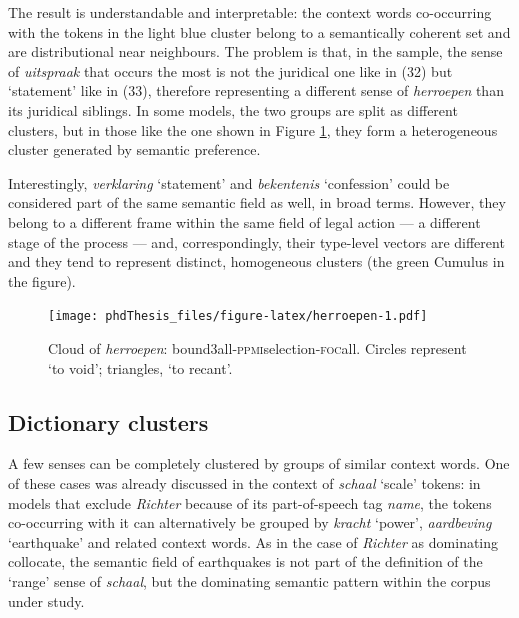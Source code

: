 \documentclass[
]{book}
\begin{document}
The result is understandable and interpretable: the context words co-occurring with the tokens in the light blue cluster belong to a semantically coherent set and are distributional near neighbours. The problem is that, in the sample, the sense of \emph{uitspraak} that occurs the most is not the juridical one like in (32) but `statement' like in (33), therefore representing a different sense of \emph{herroepen} than its juridical siblings. In some models, the two groups are split as different clusters, but in those like the one shown in Figure \ref{fig:herroepen}, they form a heterogeneous cluster generated by semantic preference.

Interestingly, \emph{verklaring} `statement' and \emph{bekentenis} `confession' could be considered part of the same semantic field as well, in broad terms. However, they belong to a different frame within the same field of legal action --- a different stage of the process --- and, correspondingly, their type-level vectors are different and they tend to represent distinct, homogeneous clusters (the green Cumulus in the figure).



\begin{figure}
\centering
\texttt{[image: phdThesis\_files/figure-latex/herroepen-1.pdf]}
\caption{\label{fig:herroepen}Cloud of \emph{herroepen}: bound3all-\textsc{ppmi}selection-\textsc{foc}all. Circles represent `to void'; triangles, `to recant'.}
\end{figure}

\hypertarget{dictionary-clusters}{%
\subsection{Dictionary clusters}\label{dictionary-clusters}}

A few senses can be completely clustered by groups of similar context words.
One of these cases was already discussed in the context of \emph{schaal} `scale' tokens: in models that exclude \emph{Richter} because of its part-of-speech tag \emph{name}, the tokens co-occurring with it can alternatively be grouped by \emph{kracht} `power', \emph{aardbeving} `earthquake' and related context words. As in the case of \emph{Richter} as dominating collocate, the semantic field of earthquakes is not part of the definition of the `range' sense of \emph{schaal}, but the dominating semantic pattern within the corpus under study.
\end{document}
